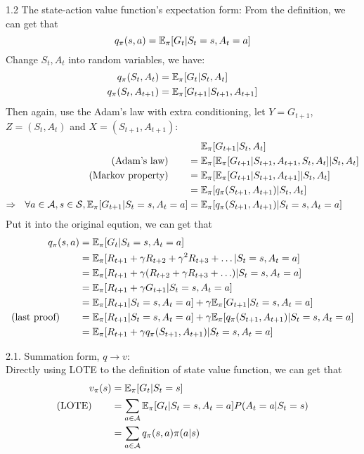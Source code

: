 \begin{homeworkProblem}
1.2 The state-action value function's expectation form: From the definition, we can get that
$$q_{\pi}(s,a) = \mathbb{E}_{\pi}[G_t | S_t=s, A_t=a]$$
Change $S_t, A_t$ into random variables, we have:
\begin{align*}
q_{\pi}(S_t,A_t) &= \mathbb{E}_{\pi}[G_t |S_t, A_t] \\
q_{\pi}(S_t,A_{t+1}) &= \mathbb{E}_{\pi}[G_{t+1} |S_{t+1}, A_{t+1}]
\end{align*}
Then again, use the Adam's law with extra conditioning, let $Y=G_{t+1}$, $Z=(S_t, A_t)$ and $X=(S_{t+1}, A_{t+1})$:
\begin{align*}
&\quad\ \mathbb{E}_{\pi}[G_{t+1}|S_t, A_t] \\
(\text{Adam's law})\qquad &= \mathbb{E}_{\pi}[\mathbb{E}_{\pi}[G_{t+1}|S_{t+1}, A_{t+1}, S_t, A_t]|S_t, A_t] \\
(\text{Markov property})\qquad &= \mathbb{E}_{\pi}[\mathbb{E}_{\pi}[G_{t+1}|S_{t+1}, A_{t+1}]|S_t, A_t] \\
&= \mathbb{E}_{\pi}[q_{\pi}(S_{t+1}, A_{t+1})|S_t, A_t] \\
\Rightarrow\ \ \forall a\in\mathcal{A}, s\in\mathcal{S}, \mathbb{E}_{\pi}[G_{t+1}|S_t=s, A_t=a] &= \mathbb{E}_{\pi}[q_{\pi}(S_{t+1}, A_{t+1})|S_t=s, A_t=a]
\end{align*}
Put it into the original eqution, we can get that
\begin{align*}
q_{\pi}(s,a) &= \mathbb{E}_{\pi}[G_{t}|S_t=s, A_t=a] \\
&= \mathbb{E}_{\pi}[R_{t+1} + \gamma R_{t+2} + \gamma^2 R_{t+3} + \ldots | S_t=s, A_t=a] \\
&= \mathbb{E}_{\pi}[R_{t+1} + \gamma (R_{t+2} + \gamma R_{t+3} + \ldots) | S_t=s, A_t=a] \\
&= \mathbb{E}_{\pi}[R_{t+1}+\gamma G_{t+1}|S_t=s, A_t=a] \\
&= \mathbb{E}_{\pi}[R_{t+1}|S_t=s, A_t=a] +\gamma \mathbb{E}_{\pi}[G_{t+1}|S_t=s, A_t=a] \\
(\text{last proof})\qquad &= \mathbb{E}_{\pi}[R_{t+1}|S_t=s, A_t=a] +\gamma \mathbb{E}_{\pi}[q_{\pi}(S_{t+1}, A_{t+1})|S_t=s, A_t=a] \\
&= \mathbb{E}_{\pi}[R_{t+1}+\gamma q_{\pi}(S_{t+1}, A_{t+1})|S_t=s, A_t=a]
\end{align*}

2.1. Summation form, $q\to v$: \\
Directly using LOTE to the definition of state value function, we can get that
\begin{align*}
v_{\pi}(s) &= \mathbb{E}_{\pi}[G_t|S_t=s] \\
\text{(LOTE)}\qquad &= \sum_{a\in\mathcal{A}} \mathbb{E}_{\pi}[G_t|S_t=s, A_t=a]P(A_t=a|S_t=s) \\
&= \sum_{a\in\mathcal{A}} q_{\pi}(s, a)\pi(a|s)
\end{align*}


\end{homeworkProblem}
